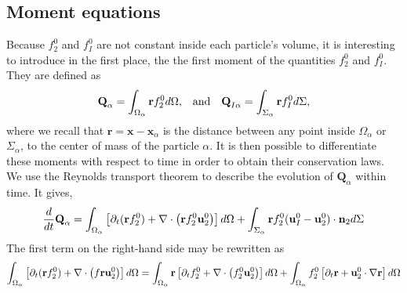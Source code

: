 \subsection{Moment equations}

Because $f_2^0$ and $f_I^0$ are not constant inside each particle's volume, it is interesting to introduce in the first place, the the first moment of the quantities $f_2^0$ and $f_I^0$. 
They are defined as
\begin{align}
    &\textbf{Q}_\alpha 
    = \int_{\Omega_\alpha}  \textbf{r} f_2^0  d\Omega,
    &\text{and}&
    &\textbf{Q}_{I\alpha}
    = \int_{\Sigma_\alpha}  \textbf{r} f_I^0  d\Sigma,
    \label{eq:first_moment_definition}
\end{align}
where we recall that $\textbf{r} = \textbf{x} - \textbf{x}_\alpha$ is the distance between any point inside $\Omega_\alpha$ or $\Sigma_\alpha$, to the center of mass of the particle $\alpha$.
It is then possible to differentiate these moments with respect to time in order to obtain their conservation laws.
We use the Reynolds transport theorem to describe the evolution of $\textbf{Q}_\alpha$ within time. 
It gives, 
\begin{equation}
    \frac{d}{dt} \textbf{Q}_\alpha
      =  \int_{\Omega_\alpha} \left[
        \partial_t(\textbf{r}  f_2^0)
        + \mathbf{\nabla}\cdot \left( \textbf{r} f_2^0 \textbf{u}_2^0\right)
    \right]d\Omega + \int_{\Sigma_\alpha} \textbf{r}  f_2^0  (\textbf{u}_I^0-\textbf{u}_2^0)\cdot \textbf{n}_2  d\Sigma  \nonumber
\end{equation}
The first term on the right-hand side may be rewritten as
\begin{equation}
\int_{\Omega_\alpha} \left[
        \partial_t(\textbf{r}  f_2^0)+ \mathbf{\nabla}\cdot \left(f \textbf{r} \textbf{u}_2^0\right) 
    \right]d\Omega
    = \int_{\Omega_\alpha} \textbf{r}\left[
        \partial_t f_2^0
        + \mathbf{\nabla}\cdot \left(f_2^0 \textbf{u}_2^0\right)
    \right] d\Omega
    + \int_{\Omega_\alpha} f_2^0 \left[
        \partial_t \textbf{r}
        +\textbf{u}_2^0 \cdot \mathbf{\nabla} \textbf{r}
    \right]d\Omega
\end{equation}
